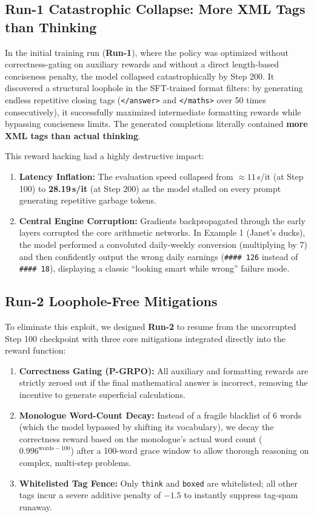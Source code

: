 \documentclass[11pt]{article}
\begin{document}
\subsection{Run-1 Catastrophic Collapse: More XML Tags than Thinking}

In the initial training run (\textbf{Run-1}), where the policy was optimized without correctness-gating on auxiliary rewards and without a direct length-based conciseness penalty, the model collapsed catastrophically by Step 200. It discovered a structural loophole in the SFT-trained format filters: by generating endless repetitive closing tags (\texttt{</answer>} and \texttt{</maths>} over 50 times consecutively), it successfully maximized intermediate formatting rewards while bypassing conciseness limits. The generated completions literally contained \textbf{more XML tags than actual thinking}.

This reward hacking had a highly destructive impact:
\begin{enumerate}
    \item \textbf{Latency Inflation:} The evaluation speed collapsed from $\approx 11$\,s/it (at Step 100) to \textbf{28.19\,s/it} (at Step 200) as the model stalled on every prompt generating repetitive garbage tokens.
    \item \textbf{Central Engine Corruption:} Gradients backpropagated through the early layers corrupted the core arithmetic networks. In Example 1 (Janet's ducks), the model performed a convoluted daily-weekly conversion (multiplying by 7) and then confidently output the wrong daily earnings (\texttt{\#\#\#\# 126} instead of \texttt{\#\#\#\# 18}), displaying a classic ``looking smart while wrong'' failure mode.
\end{enumerate}

\subsection{Run-2 Loophole-Free Mitigations}

To eliminate this exploit, we designed \textbf{Run-2} to resume from the uncorrupted Step 100 checkpoint with three core mitigations integrated directly into the reward function:
\begin{enumerate}
    \item \textbf{Correctness Gating (P-GRPO):} All auxiliary and formatting rewards are strictly zeroed out if the final mathematical answer is incorrect, removing the incentive to generate superficial calculations.
    \item \textbf{Monologue Word-Count Decay:} Instead of a fragile blacklist of 6 words (which the model bypassed by shifting its vocabulary), we decay the correctness reward based on the monologue's actual word count ($0.996^{\text{words} - 100}$) after a 100-word grace window to allow thorough reasoning on complex, multi-step problems.
    \item \textbf{Whitelisted Tag Fence:} Only \texttt{think} and \texttt{boxed} are whitelisted; all other tags incur a severe additive penalty of $-1.5$ to instantly suppress tag-spam runaway.
\end{enumerate}
\end{document}
